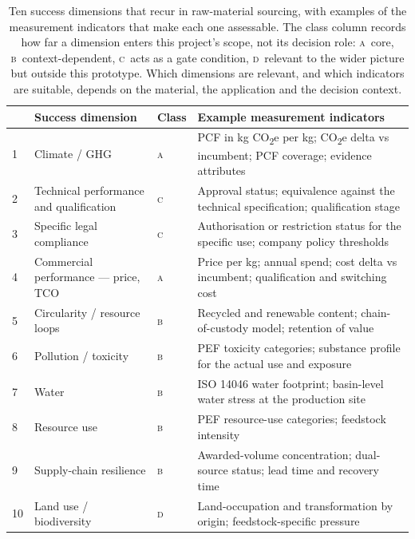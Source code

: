 \documentclass[10pt,twocolumn,a4paper]{article}
\newcommand{\co}{CO\textsubscript{2}e}
\newcommand{\dimhead}[1]{\textbf{#1}}
\begin{document}
\begin{table}[t]
  \caption{Ten success dimensions that recur in raw-material sourcing, with
  examples of the measurement indicators that make each one assessable. The class
  column records how far a dimension enters this project's scope, not its
  decision role: \textsc{a}~core, \textsc{b}~context-dependent,
  \textsc{c}~acts as a gate condition, \textsc{d}~relevant to the wider picture
  but outside this prototype. Which dimensions are relevant, and which indicators are suitable,
  depends on the material, the application and the decision context.}
  \label{tab:dimensions}
  \small
  \begin{tabular}{@{}p{}p{}p{}p{}@{}}
    \toprule
    & \dimhead{Success dimension} & \dimhead{Class} & \dimhead{Example measurement indicators} \\
    \midrule
    1 & Climate / GHG & \textsc{a} & PCF in kg \co{} per kg; \co{} delta vs incumbent; PCF coverage; evidence attributes \\
    2 & Technical performance and qualification & \textsc{c} & Approval status; equivalence against the technical specification; qualification stage \\
    3 & Specific legal compliance & \textsc{c} & Authorisation or restriction status for the specific use; company policy thresholds \\
    4 & Commercial performance --- price, TCO & \textsc{a} & Price per kg; annual spend; cost delta vs incumbent; qualification and switching cost \\
    5 & Circularity / resource loops & \textsc{b} & Recycled and renewable content; chain-of-custody model; retention of value \\
    6 & Pollution / toxicity & \textsc{b} & PEF toxicity categories; substance profile for the actual use and exposure \\
    7 & Water & \textsc{b} & ISO 14046 water footprint; basin-level water stress at the production site \\
    8 & Resource use & \textsc{b} & PEF resource-use categories; feedstock intensity \\
    9 & Supply-chain resilience & \textsc{b} & Awarded-volume concentration; dual-source status; lead time and recovery time \\
    10 & Land use / biodiversity & \textsc{d} & Land-occupation and transformation by origin; feedstock-specific pressure \\
    \bottomrule
  \end{tabular}
\end{table}
\end{document}
